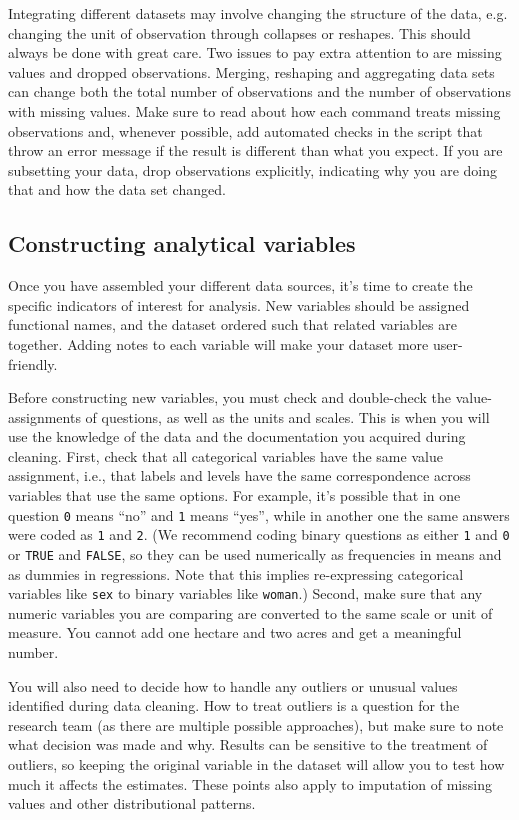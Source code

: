 Integrating different datasets may involve changing the structure of the data,
e.g. changing the unit of observation through collapses or reshapes.
This should always be done with great care. 
Two issues to pay extra attention to are missing values and dropped observations.
Merging, reshaping and aggregating data sets can change both the total number of observations
and the number of observations with missing values.
Make sure to read about how each command treats missing observations and,
whenever possible, add automated checks in the script that throw an error message if the result is different than what you expect.
If you are subsetting your data,
drop observations explicitly,
indicating why you are doing that and how the data set changed.

\subsection{Constructing analytical variables}
Once you have assembled your different data sources, 
it's time to create the specific indicators of interest for analysis. 
New variables should be assigned functional names, 
and the dataset ordered such that related variables are together.
Adding notes to each variable will make your dataset more user-friendly.


Before constructing new variables,
you must check and double-check the value-assignments of questions,
as well as the units and scales.
This is when you will use the knowledge of the data and the documentation you acquired during cleaning.
First, check that all categorical variables have the same value assignment, i.e.,
that labels and levels have the same correspondence across variables that use the same options.
For example, it's possible that in one question \texttt{0} means ``no'' and \texttt{1} means ``yes'',
while in another one the same answers were coded as \texttt{1} and \texttt{2}.
(We recommend coding binary questions as either \texttt{1} and \texttt{0} or \texttt{TRUE} and \texttt{FALSE},
so they can be used numerically as frequencies in means and as dummies in regressions.
Note that this implies re-expressing categorical variables like \texttt{sex} to binary variables like \texttt{woman}.)
Second, make sure that any numeric variables you are comparing are converted to the same scale or unit of measure.
You cannot add one hectare and two acres and get a meaningful number.

You will also need to decide how to handle any outliers or unusual values identified during data cleaning. 
How to treat outliers is a question for the research team (as there are multiple possible approaches),
but make sure to note what decision was made and why.
Results can be sensitive to the treatment of outliers,
so keeping the original variable in the dataset will allow you to test how much it affects the estimates.
These points also apply to imputation of missing values and other distributional patterns.

